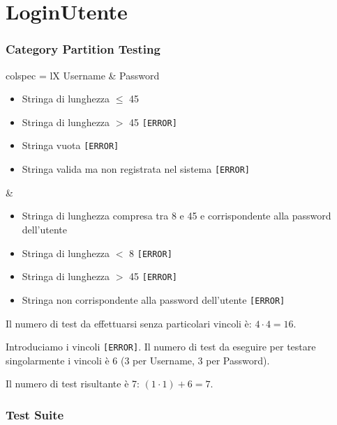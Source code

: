 \section{LoginUtente}

\subsubsection*{Category Partition Testing}

\begin{table}[H]
	\centering
	\footnotesize
	\begin{partest}{colspec = lX}
		Username & Password \\
		\begin{itemize}[leftmargin=*]
			\item Stringa di lunghezza $\leq$ 45
			\item Stringa di lunghezza $>$ 45 \texttt{[ERROR]}
			\item Stringa vuota \texttt{[ERROR]}
			\item Stringa valida ma non registrata nel sistema \texttt{[ERROR]}
		\end{itemize} &
		\begin{itemize}[leftmargin=*]
			\item Stringa di lunghezza compresa tra 8 e 45 e corrispondente alla password dell'utente
			\item Stringa di lunghezza $<$ 8 \texttt{[ERROR]}
			\item Stringa di lunghezza $>$ 45 \texttt{[ERROR]}
			\item Stringa non corrispondente alla password dell'utente \texttt{[ERROR]}
		\end{itemize}
	\end{partest}
\end{table}

\noindent Il numero di test da effettuarsi senza particolari vincoli è: $4 \cdot 4 = 16$.

\noindent Introduciamo i vincoli \texttt{[ERROR]}. Il numero di test da eseguire per testare singolarmente i vincoli è 6 (3 per Username, 3 per Password).

\noindent Il numero di test risultante è 7: $(1 \cdot 1) + 6 = 7$.

\subsubsection*{Test Suite}

